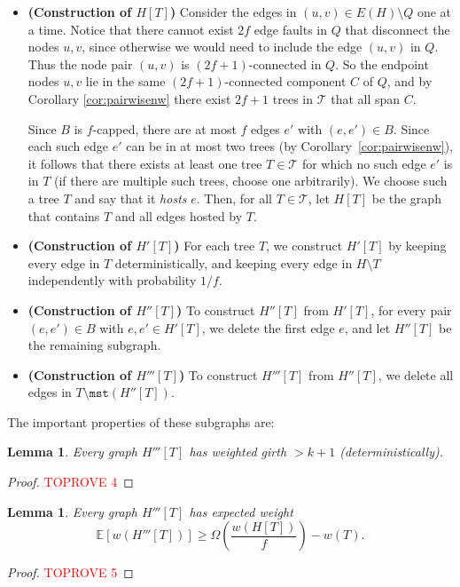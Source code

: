 \documentclass{article}
\theoremstyle{plain}
\newtheorem{lemma}[theorem]{Lemma}
\theoremstyle{definition}
\newcommand{\mst}{\texttt{mst}}
\newcommand{\tee}{\mathcal{T}}
\begin{document}
\begin{itemize}
\item \textbf{(Construction of $H[T]$)}
Consider the edges in $(u, v) \in E(H) \setminus Q$ one at a time.
Notice that there cannot exist $2f$ edge faults in $Q$ that disconnect the nodes $u, v$, since otherwise we would need to include the edge $(u, v)$ in $Q$.
Thus the node pair $(u, v)$ is $(2f+1)$-connected in $Q$.
So the endpoint nodes $u, v$ lie in the same $(2f+1)$-connected component $C$ of $Q$, and by Corollary \ref{cor:pairwisenw} there exist $2f+1$ trees in $\tee$ that all span $C$.

Since $B$ is $f$-capped, there are at most $f$ edges $e'$ with $(e, e') \in B$.
Since each such edge $e'$ can be in at most two trees (by Corollary~\ref{cor:pairwisenw}), it follows that there exists at least one tree $T \in \tee$ for which no such edge $e'$ is in $T$ (if there are multiple such trees, choose one arbitrarily).
We choose such a tree $T$ and say that it \emph{hosts} $e$.
Then, for all $T \in \tee$, let $H[T]$ be the graph that contains $T$ and all edges hosted by $T$.

\item \textbf{(Construction of $H'[T]$)}
For each tree $T$, we construct $H'[T]$ by keeping every edge in $T$ deterministically, and keeping every edge in $H \setminus T$ independently with probability $1/f$.

\item \textbf{(Construction of $H''[T]$)}
To construct $H''[T]$ from $H'[T]$, for every pair $(e, e') \in B$ with $e, e' \in H'[T]$, we delete the first edge $e$, and let $H''[T]$ be the remaining subgraph.

\item \textbf{(Construction of $H'''[T]$)}
To construct $H'''[T]$ from $H''[T]$, we delete all edges in $T \setminus \mst(H''[T])$.
\end{itemize}

The important properties of these subgraphs are:
\begin{lemma} \label{lem:highwg}
Every graph $H'''[T]$ has weighted girth $>k+1$ (deterministically).
\end{lemma}
\begin{proof}\textcolor{red}{TOPROVE 4}\end{proof}

\begin{lemma} \label{lem:exphweight}
Every graph $H'''[T]$ has expected weight
$$\mathbb{E}\left[w(H'''[T])\right] \ge \Omega\left( \frac{w(H[T])}{f} \right) - w(T).$$
\end{lemma}
\begin{proof}\textcolor{red}{TOPROVE 5}\end{proof}
\end{document}
